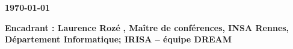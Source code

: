 \vspace{12.7cm}

\hspace{7cm}\begin{minipage}{12cm}
  \noindent \Huge\bfseries \thetitle 			%
      \baselineskip=23pt
  \vspace{5mm}    

  {\Large \bfseries\color{gray} \today}
  \vspace{5mm}

  \baselineskip=15pt
  {\Large \bfseries\color{black} Encadrant : Laurence Rozé}%
  {\large\bfseries\color{gray}, Maître de conférences, INSA Rennes, Département Informatique; IRISA -- équipe DREAM}

\end{minipage}


%

%

\newpage



\restoregeometry